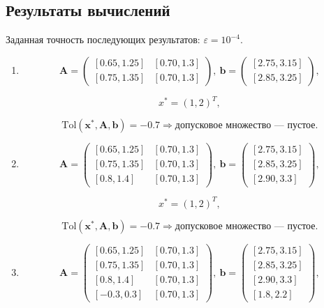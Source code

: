 \documentclass{article}
\begin{document}
  \subsection{Результаты вычислений}

  Заданная точность последующих результатов: \( \varepsilon = 10^{-4} \).

  \begin{enumerate}
    \item
      \[
        \mathbf{A} = \begin{pmatrix}
          [0.65, 1.25] & [0.70, 1.3] \\
          [0.75, 1.35] & [0.70, 1.3]
        \end{pmatrix},
        ~
        \mathbf{b} = \begin{pmatrix}
          [2.75, 3.15] \\
          [2.85, 3.25]
        \end{pmatrix},
      \]

      \[
        x^* = (1, 2)^T,
      \]

      \[
        \text{Tol}(\mathbf{x}^*, \mathbf{A}, \mathbf{b}) = -0.7
        \Rightarrow \text{допусковое множество --- пустое}.
      \]
    \item
      \[
        \mathbf{A} = \begin{pmatrix}
          [0.65, 1.25] & [0.70, 1.3] \\
          [0.75, 1.35] & [0.70, 1.3] \\
          [0.8, 1.4] & [0.70, 1.3]
        \end{pmatrix},
        ~
        \mathbf{b} = \begin{pmatrix}
          [2.75, 3.15] \\
          [2.85, 3.25] \\
          [2.90, 3.3]
        \end{pmatrix},
      \]

      \[
        x^* = (1, 2)^T,
      \]

      \[
        \text{Tol}(\mathbf{x}^*, \mathbf{A}, \mathbf{b}) = -0.7 \Rightarrow \text{допусковое множество --- пустое}.
      \]
    \item
      \[
        \mathbf{A} = \begin{pmatrix}
          [0.65, 1.25] & [0.70, 1.3] \\
          [0.75, 1.35] & [0.70, 1.3] \\
          [0.8, 1.4] & [0.70, 1.3] \\
          [-0.3, 0.3] & [0.70, 1.3]
        \end{pmatrix},
        ~
        \mathbf{b} = \begin{pmatrix}
          [2.75, 3.15] \\
          [2.85, 3.25] \\
          [2.90, 3.3] \\
          [1.8, 2.2]
        \end{pmatrix},
      \]


\end{enumerate}
\end{document}
